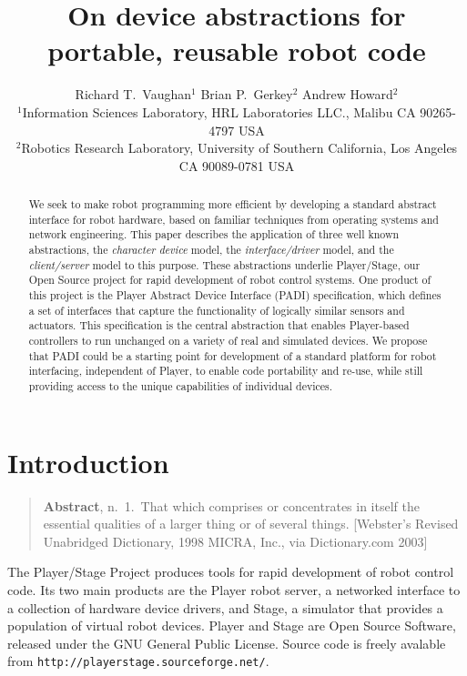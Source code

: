 \documentclass[letterpaper, 10 pt, conference]{iros03}
\title{\LARGE On device abstractions for portable, reusable robot code}
\author{Richard T.~Vaughan$^1$ \hspace{16mm} Brian P.~Gerkey$^2$
\hspace{16mm} Andrew Howard$^2$ \vspace{2mm}\\ $^1$Information
Sciences Laboratory, HRL Laboratories LLC., Malibu CA 90265-4797 USA
\\ $^2$Robotics Research Laboratory, University of Southern
California, Los Angeles CA 90089-0781 USA}
\begin{document}
\maketitle



\begin{abstract}
We seek to make robot programming more efficient by developing a
standard abstract interface for robot hardware, based on familiar
techniques from operating systems and network engineering. This paper
describes the application of three well known abstractions, the
\emph{character device} model, the \emph{interface/driver} model, and
the \emph{client/server} model to this purpose. These abstractions
underlie Player/Stage, our Open Source project for rapid development of
robot control systems. One product of this project is the Player
Abstract Device Interface (PADI) specification, which defines a set of
interfaces that capture the functionality of logically similar sensors
and actuators. This specification is the central abstraction that
enables Player-based controllers to run unchanged on a variety of real
and simulated devices. We propose that PADI could be a starting point
for development of a standard platform for robot interfacing,
independent of Player, to enable code portability and re-use, while
still providing access to the unique capabilities of individual
devices.
\end{abstract}


\section{Introduction}
\label{intro}

\begin{quotation}
{\bf Abstract}, n.~1.~That which comprises or concentrates in itself the
essential qualities of a larger thing or of several things. [Webster's Revised Unabridged Dictionary, 1998 MICRA, Inc., via Dictionary.com 2003]
\end{quotation}

The Player/Stage Project produces tools for rapid development of robot
control code. Its two main products are the Player robot server, a
networked interface to a collection of hardware device drivers, and
Stage, a simulator that provides a population of virtual robot
devices. Player and Stage are Open Source Software, released under the GNU
General Public License. Source code is freely avalable from
\verb+http://playerstage.sourceforge.net/+.
\end{document}
